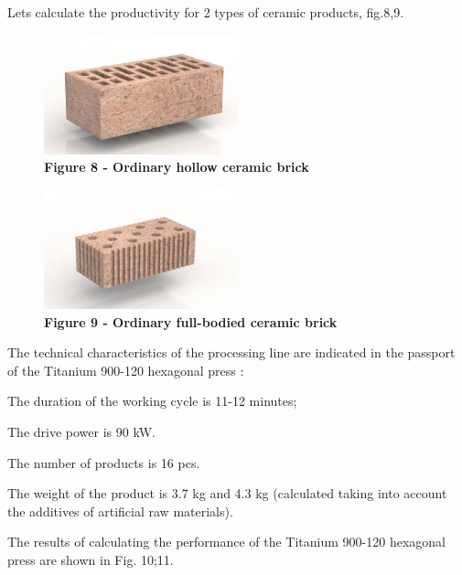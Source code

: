 Let\textquotesingle s calculate the productivity for 2 types of ceramic
products, fig.8,9.

\begin{figure}[H]
	\centering
	\includegraphics[width=0.5\textwidth]{assets/274}
	\caption*{\bfseries Figure 8 - Ordinary hollow ceramic brick}
\end{figure}



\begin{figure}[H]
	\centering
	\includegraphics[width=0.5\textwidth]{assets/275}
	\caption*{\bfseries Figure 9 - Ordinary full-bodied ceramic brick}
\end{figure}



The technical characteristics of the processing line are indicated in
the passport of the Titanium 900-120 hexagonal press :

The duration of the working cycle is 11-12 minutes;

The drive power is 90 kW.

The number of products is 16 pcs.

The weight of the product is 3.7 kg and 4.3 kg (calculated taking into
account the additives of artificial raw materials).

The results of calculating the performance of the Titanium 900-120
hexagonal press are shown in Fig. 10;11.

